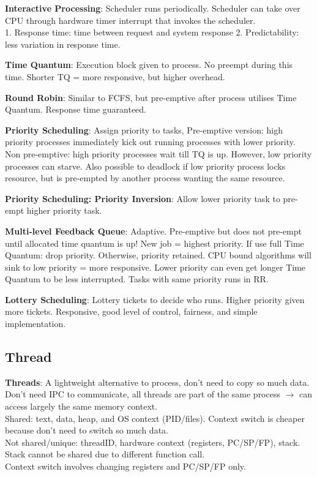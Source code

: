 \documentclass[a4paper,landscape]{article}
\newcommand{\rntopic}[1]{\vspace{-1.5em}\subsection*{#1}\vspace{-0.5em}}
\newcommand{\rnname}[1]{\textbf{#1}}
\begin{document}
\begin{multicols*}{4}
\begin{flatitemize}
\item \rnname{Interactive Processing}: Scheduler runs periodically. Scheduler can take over CPU through hardware timer interrupt that invokes the scheduler. \\
1. Response time: time between request and system response
2. Predictability: less variation in response time.
\item \rnname{Time Quantum}: Execution block given to process. No preempt during this time. Shorter TQ = more responsive, but higher overhead.
\item \rnname{Round Robin}: Similar to FCFS, but pre-emptive after process utilises Time Quantum. Response time guaranteed. 
\item \rnname{Priority Scheduling}: Assign priority to tasks, Pre-emptive version: high priority processes immediately kick out running processes with lower priority. Non pre-emptive: high priority processes wait till TQ is up. However, low priority processes can starve. Also possible to deadlock if low priority process locks resource, but is pre-empted by another process wanting the same resource.
\item \rnname{Priority Scheduling: Priority Inversion}: Allow lower priority task to pre-empt higher priority task.
\item \rnname{Multi-level Feedback Queue}: Adaptive. Pre-emptive but does not pre-empt until allocated time quantum is up! New job = highest priority. If use full Time Quantum: drop priority. Otherwise, priority retained. CPU bound algorithms will sink to low priority = more responsive. Lower priority can even get longer Time Quantum to be less interrupted. Tasks with same priority runs in RR.
\item \rnname{Lottery Scheduling}: Lottery tickets to decide who runs. Higher priority given more tickets. Responsive, good level of control, fairness, and simple implementation.

\end{flatitemize}

\rntopic{Thread}
\begin{flatitemize}
\item \rnname{Threads}: A lightweight alternative to process, don't need to copy so much data. Don't need IPC to communicate, all threads are part of the same process $\rightarrow$ can access largely the same memory context.\\
Shared: text, data, heap, and OS context (PID/files). Context switch is cheaper because don't need to switch so much data.\\
Not shared/unique: threadID, hardware context (registers, PC/SP/FP), stack. Stack cannot be shared due to different function call. \\
Context switch involves changing registers and PC/SP/FP only.\\
\vspace{-1.5em}


\end{flatitemize}
\end{multicols*}
\end{document}
